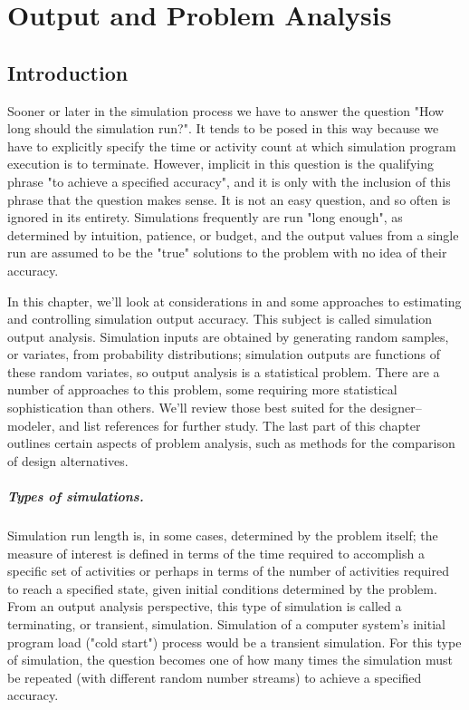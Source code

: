 \chapter{Output and Problem Analysis}
\label{chap:output-problem-analysis}

\section{Introduction}
\label{sec:output-introduction}

Sooner or later in the simulation process we have to answer the question
"How long should the simulation run?". It tends to be posed in this way
because we have to explicitly specify the time or activity count at which
simulation program execution is to terminate. However, implicit in this
question is the qualifying phrase "to achieve a specified accuracy", and it is
only with the inclusion of this phrase that the question makes sense. It is not
an easy question, and so often is ignored in its entirety. Simulations
frequently are run "long enough", as determined by intuition, patience, or
budget, and the output values from a single run are assumed to be the "true"
solutions to the problem with no idea of their accuracy.

In this chapter, we'll look at considerations in and some approaches to
estimating and controlling simulation output accuracy. This subject is called
simulation output analysis. Simulation inputs are obtained by generating
random samples, or variates, from probability distributions; simulation
outputs are functions of these random variates, so output analysis is a
statistical problem. There are a number of approaches to this problem, some
requiring more statistical sophistication than others. We'll review those
best suited for the designer--modeler, and list references for further study.
The last part of this chapter outlines certain aspects of problem analysis,
such as methods for the comparison of design alternatives.

\paragraph{Types of simulations.}
Simulation run length is, in some cases, determined by the problem itself; the
measure of interest is defined in terms of the time required to accomplish a
specific set of activities or perhaps in terms of the number of activities
required to reach a specified state, given initial conditions determined by the
problem. From an output analysis perspective, this type of simulation is called
a terminating, or transient, simulation. Simulation of a computer system's
initial program load ("cold start") process would be a transient simulation.
For this type of simulation, the question becomes one of how many times the
simulation must be repeated (with different random number streams) to achieve
a specified accuracy.

